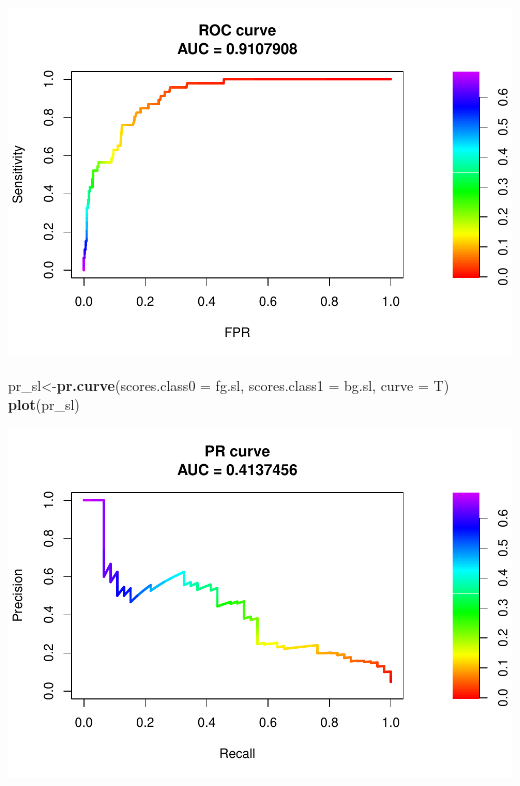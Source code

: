 \documentclass[]{article}
\newenvironment{Shaded}{\begin{snugshade}}{\end{snugshade}}
\newcommand{\DataTypeTok}[1]{\textcolor[rgb]{0.13,0.29,0.53}{#1}}
\newcommand{\DecValTok}[1]{\textcolor[rgb]{0.00,0.00,0.81}{#1}}
\newcommand{\FloatTok}[1]{\textcolor[rgb]{0.00,0.00,0.81}{#1}}
\newcommand{\KeywordTok}[1]{\textcolor[rgb]{0.13,0.29,0.53}{\textbf{#1}}}
\newcommand{\NormalTok}[1]{#1}
\newcommand{\OperatorTok}[1]{\textcolor[rgb]{0.81,0.36,0.00}{\textbf{#1}}}
\newcommand{\StringTok}[1]{\textcolor[rgb]{0.31,0.60,0.02}{#1}}
\begin{document}
\includegraphics{ml_analysis_lagged_with_imputation_files/figure-latex/unnamed-chunk-36-1.pdf}

\begin{Shaded}
\begin{Highlighting}[]
\NormalTok{pr_sl<-}\KeywordTok{pr.curve}\NormalTok{(}\DataTypeTok{scores.class0 =}\NormalTok{ fg.sl,}
                \DataTypeTok{scores.class1 =}\NormalTok{ bg.sl,}
                \DataTypeTok{curve =}\NormalTok{ T)}
\KeywordTok{plot}\NormalTok{(pr_sl)}
\end{Highlighting}
\end{Shaded}

\includegraphics{ml_analysis_lagged_with_imputation_files/figure-latex/unnamed-chunk-37-1.pdf}

\begin{Shaded}
\end{Shaded}
\end{document}
